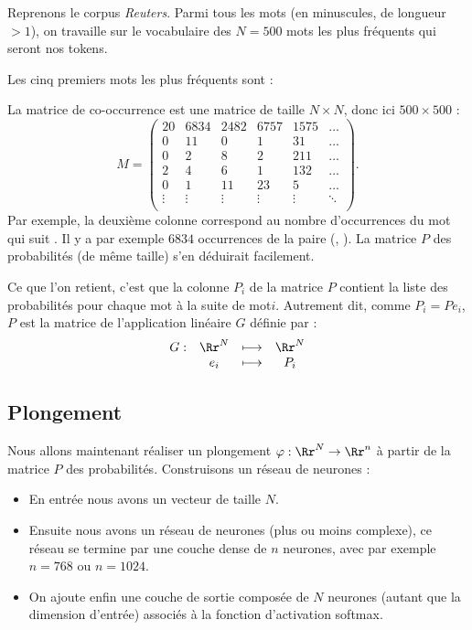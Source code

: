 \documentclass[11pt,class=report,crop=false]{standalone}
\begin{document}
\begin{exemple}
Reprenons le corpus \emph{Reuters}. Parmi tous les mots (en minuscules, de longueur $>1$), on travaille sur le vocabulaire  des $N=500$ mots les plus fréquents qui seront nos tokens.

Les cinq premiers mots les plus fréquents sont : 

La matrice de co-occurrence est une matrice de taille $N \times N$, donc ici $500 \times 500$ :
$$M = \begin{pmatrix}
 20 & 6834 & 2482 & 6757 & 1575 & \ldots \\
  0 &  11  &  0   & 1 &  31     & \ldots \\
  0 &   2  &  8   & 2 & 211     &\ldots \\
  2 &   4  &  6   & 1 & 132     &\ldots \\
  0 &   1  & 11   & 23 &   5    & \ldots \\
  \vdots & \vdots & \vdots & \vdots & \vdots & \ddots \\
\end{pmatrix}.$$
Par exemple, la deuxième colonne correspond au nombre d'occurrences du mot qui suit . 
Il y a par exemple $6834$ occurrences de la paire (, ).
La matrice $P$ des probabilités (de même taille) s'en déduirait facilement.
\end{exemple}

Ce que l'on retient, c'est que la colonne $P_i$ de la matrice $P$ contient la liste des probabilités pour chaque mot à la suite de mot$i$. Autrement dit, comme $P_i = P e_i$, $P$ est la matrice de l'application linéaire $G$ définie par :
$$
\begin{array}{rccc}
G : & \Rr^N & \longmapsto & \Rr^N \\
    & e_i   & \longmapsto & P_i
\end{array}
$$




\subsection{Plongement}


Nous allons maintenant réaliser un plongement $\varphi : \Rr^N \to \Rr^n$ à partir de la matrice $P$ des probabilités.
Construisons un réseau de neurones :
\begin{itemize}
	\item En entrée nous avons un vecteur de taille $N$.
	
	\item Ensuite nous avons un réseau de neurones (plus ou moins complexe), ce réseau se termine par une couche dense de $n$ neurones, avec par exemple $n=768$ ou $n=1024$. 
	
	\item On ajoute enfin une couche de sortie composée de $N$ neurones (autant que la dimension d'entrée) associés à la fonction d'activation softmax.
\end{itemize}
\end{document}
